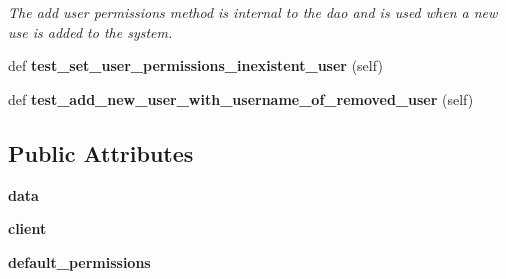 \begin{DoxyCompactItemize}
\begin{DoxyCompactList}\small\item\em The add user permissions method is internal to the dao and is used when a new use is added to the system. \end{DoxyCompactList}\item 
\mbox{\label{classtests_1_1test__13__actions__on__removed__user_1_1_test_user_routes_addbff58b73ef5ef9df0413acab3c9fc5}} 
def {\bfseries test\+\_\+set\+\_\+user\+\_\+permissions\+\_\+inexistent\+\_\+user} (self)
\item 
\mbox{\label{classtests_1_1test__13__actions__on__removed__user_1_1_test_user_routes_a46d3cffc09c23e5928f59152c0b013e9}} 
def {\bfseries test\+\_\+add\+\_\+new\+\_\+user\+\_\+with\+\_\+username\+\_\+of\+\_\+removed\+\_\+user} (self)
\end{DoxyCompactItemize}
\subsection*{Public Attributes}
\begin{DoxyCompactItemize}
\item 
\mbox{\label{classtests_1_1test__13__actions__on__removed__user_1_1_test_user_routes_aeefb5f93b8f194f5c8695a8a8c77769a}} 
{\bfseries data}
\item 
\mbox{\label{classtests_1_1test__13__actions__on__removed__user_1_1_test_user_routes_a18d3632ffd5596b3a1f7af60494dba91}} 
{\bfseries client}
\item 
\mbox{\label{classtests_1_1test__13__actions__on__removed__user_1_1_test_user_routes_a62e1eedc35e5152d8b098f98dee6e636}} 
{\bfseries default\+\_\+permissions}
\end{DoxyCompactItemize}


